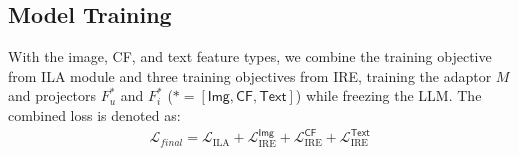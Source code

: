 \documentclass[sigconf]{acmart}
\newcommand{\rectoken}{$\left[ \texttt{REC} \right]$}
\begin{document}



\subsection{Model Training}
\label{sec:training}
With the image, CF, and text feature types, we combine the training objective from ILA module and three training objectives from IRE, training the adaptor $M$ and projectors $F^{*}_{u}$ and $F^{*}_i$ ($*=[\textsf{Img},\textsf{CF},\textsf{Text}]$) while freezing the LLM. The combined loss is denoted as:
\begin{equation}
\begin{split}
    \mathcal{L}_{final} = \mathcal{L}_{\text{ILA}} + \mathcal{L}_{\text{IRE}}^\textsf{Img} + \mathcal{L}_{\text{IRE}}^\textsf{CF}+  \mathcal{L}_{\text{IRE}}^\textsf{Text}
\label{eqn:7}
\end{split}
\end{equation}
\end{document}
